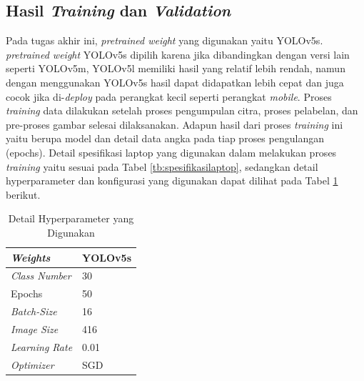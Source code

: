 \subsection{Hasil \textit{Training} dan \textit{Validation}}
\label{subsec:hasiltrainvaldata}

Pada tugas akhir ini, \textit{pretrained weight} yang digunakan yaitu YOLOv5s. \textit{pretrained weight} YOLOv5s dipilih karena jika dibandingkan dengan versi lain seperti YOLOv5m, YOLOv5l memiliki hasil yang relatif lebih rendah, namun dengan menggunakan YOLOv5s hasil dapat didapatkan lebih cepat dan juga cocok jika di-\textit{deploy} pada perangkat kecil seperti perangkat \textit{mobile}. Proses \textit{training} data dilakukan setelah proses pengumpulan citra, proses pelabelan, dan pre-proses gambar selesai dilaksanakan. Adapun hasil dari proses \textit{training} ini yaitu berupa model dan detail data angka pada tiap proses pengulangan  (epochs). Detail spesifikasi laptop yang digunakan dalam melakukan proses \textit{training} yaitu sesuai pada Tabel \ref{tb:spesifikasilaptop}, sedangkan detail hyperparameter dan konfigurasi yang digunakan dapat dilihat pada Tabel \ref*{tb:parametertrain} berikut. \par 

\begin{table}[H]
  \begin{center}
    \begin{tabularx}{0.5\textwidth}{|X<{\centering}|X<{\centering}|}
      \hline
      \textit{Weights}                         & YOLOv5s                 \\ \hline
      \textit{Class Number}                    & 30                      \\ \hline
      Epochs                                   & 50                      \\ \hline
      \textit{Batch-Size}                      & 16                      \\ \hline
      \textit{Image Size}                      & 416                     \\ \hline
      \textit{Learning Rate}                   & 0.01                    \\ \hline
      \textit{Optimizer}                       & SGD                     \\ \hline
    \end{tabularx}
  \end{center}  
  \caption{Detail Hyperparameter yang Digunakan}
  \label{tb:parametertrain}
\end{table}



